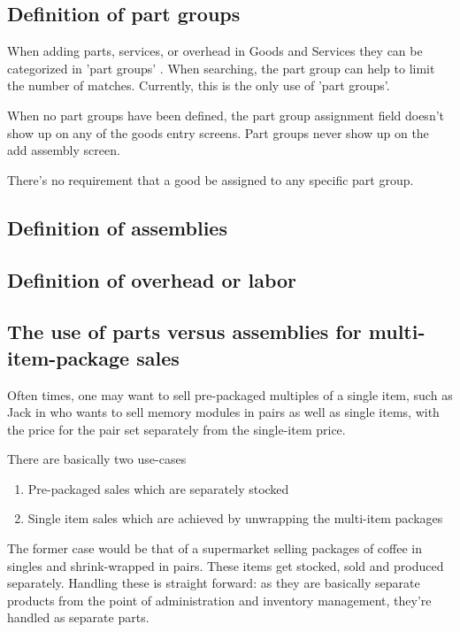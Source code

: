 \subsection{Definition of part groups}
\label{subsec-parts-groups}

When adding parts, services, or overhead in Goods and Services they can be categorized in 'part groups' .
When searching, the part group can help to limit the number of matches.  Currently, this is the only use of 'part groups'.

When no part groups have been defined, the part group assignment field doesn't
show up on any of the goods entry screens. Part groups never show up on the add assembly screen.

There's no requirement that a good be assigned to any specific part group.

\subsection{Definition of assemblies}
\label{subsec-assemblies-definition}


\subsection{Definition of overhead or labor}
\label{subsec-overhead-definition}

\subsection{The use of parts versus assemblies for multi-item-package sales}
\label{subsec-parts-versus-assemblies}

Often times, one may want to sell pre-packaged multiples of a single item, such as Jack
in  who wants to sell memory modules in pairs as well as
single items, with the price for the pair set separately from the single-item price.

There are basically two use-cases

\begin{enumerate}
\item Pre-packaged sales which are separately stocked
\item Single item sales which are achieved by unwrapping the multi-item packages
\end{enumerate}

The former case would be that of a supermarket selling packages of coffee in
singles and shrink-wrapped in pairs. These items get stocked, sold and produced separately.
Handling these is straight forward: as they are basically separate products from the point
of administration and inventory management, they're handled as separate parts.

